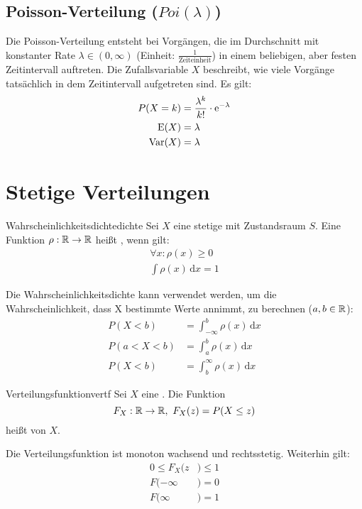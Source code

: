 \subsection{Poisson-Verteilung ($Poi(\lambda)$)}

Die Poisson-Verteilung entsteht bei Vorgängen, die im Durchschnitt mit
konstanter Rate $\lambda \in (0, \infty)$ (Einheit: $\frac{1}{\text{Zeiteinheit}}$) 
in einem beliebigen, aber festen Zeitintervall auftreten. 
Die Zufallsvariable $X$ beschreibt, wie viele Vorgänge tatsächlich in 
dem Zeitintervall aufgetreten sind. Es gilt:
\begin{align*}
P(X=k) &= \frac{\lambda^k}{k!}\cdot\mathrm{e}^{-\lambda} \\
\operatorname{E}(X) &= \lambda \\
\operatorname{Var}(X) &= \lambda
\end{align*}

\section{Stetige Verteilungen}

\begin{definition}{Wahrscheinlichkeitsdichte}{dichte}
Sei $X$ eine stetige  mit Zustandsraum $S$.
Eine Funktion $\rho: \mathbb{R} \rightarrow \mathbb{R}$ heißt ,
wenn gilt:
\begin{align*}
  \forall x: \rho(x) \ge 0 \\
  \int \rho(x) \,\mathrm{d}x = 1
\end{align*}
\end{definition}

Die Wahrscheinlichkeitsdichte kann verwendet werden, um die Wahrscheinlichkeit,
dass X bestimmte Werte annimmt, zu berechnen ($a,b\in\mathbb{R}$):
\begin{align*}
  P(X < b) &= \int_{-\infty}^{b}\rho(x)\,\mathrm{d}x\\
  P(a<X<b) &= \int_{a}^{b}\rho(x)\,\mathrm{d}x\\
  P(X < b) &= \int^{\infty}_{b}\rho(x)\,\mathrm{d}x
\end{align*}

\begin{definition}{Verteilungsfunktion}{vertf}
Sei $X$ eine . Die Funktion
\[F_X:\mathbb{R}\to\mathbb{R},\ F_X(z) = P(X \le z)\]
heißt  von $X$.
\end{definition}

Die Verteilungsfunktion ist monoton wachsend und rechtsstetig. Weiterhin gilt:
\begin{align*}
0\le F_X(z&)\le 1 \\
F(-\infty&) = 0 \\
F(\infty&) = 1
\end{align*}

